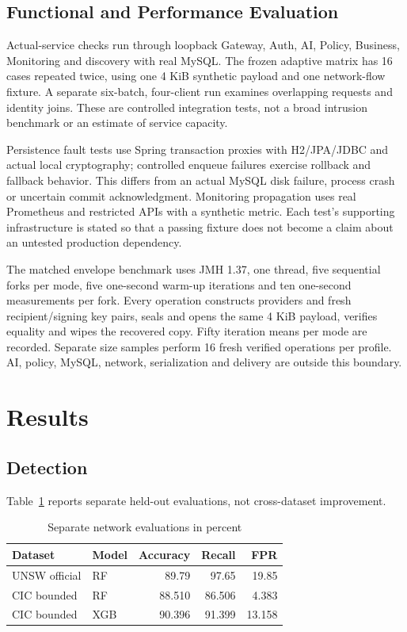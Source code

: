 \documentclass[conference,a4paper]{IEEEtran}
\begin{document}
\subsection{Functional and Performance Evaluation}
Actual-service checks run through loopback Gateway, Auth, AI, Policy, Business, Monitoring and discovery with real MySQL. The frozen adaptive matrix has 16 cases repeated twice, using one 4 KiB synthetic payload and one network-flow fixture. A separate six-batch, four-client run examines overlapping requests and identity joins. These are controlled integration tests, not a broad intrusion benchmark or an estimate of service capacity.

Persistence fault tests use Spring transaction proxies with H2/JPA/JDBC and actual local cryptography; controlled enqueue failures exercise rollback and fallback behavior. This differs from an actual MySQL disk failure, process crash or uncertain commit acknowledgment. Monitoring propagation uses real Prometheus and restricted APIs with a synthetic metric. Each test's supporting infrastructure is stated so that a passing fixture does not become a claim about an untested production dependency.

The matched envelope benchmark uses JMH 1.37, one thread, five sequential forks per mode, five one-second warm-up iterations and ten one-second measurements per fork. Every operation constructs providers and fresh recipient/signing key pairs, seals and opens the same 4 KiB payload, verifies equality and wipes the recovered copy. Fifty iteration means per mode are recorded. Separate size samples perform 16 fresh verified operations per profile. AI, policy, MySQL, network, serialization and delivery are outside this boundary.

\section{Results}
\subsection{Detection}
Table~\ref{network} reports separate held-out evaluations, not cross-dataset improvement.
\begin{table}[t]
\caption{Separate network evaluations in percent}\label{network}\centering\footnotesize
\begin{tabular}{|l|l|r|r|r|}\hline
Dataset&Model&Accuracy&Recall&FPR\\\hline
UNSW official&RF&89.79&97.65&19.85\\\hline
CIC bounded&RF&88.510&86.506&4.383\\\hline
CIC bounded&XGB&90.396&91.399&13.158\\\hline
\end{tabular}
\end{table}
\end{document}
